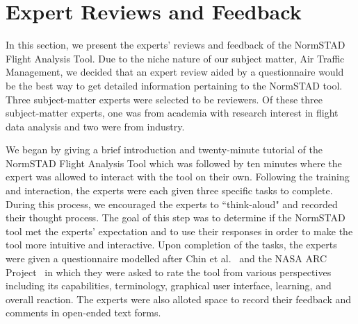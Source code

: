 \documentclass{sig-alternate}
\begin{document}
\section{Expert Reviews and Feedback}
\label{sec-expert-review}

In this section, we present the experts' reviews and feedback of the NormSTAD Flight 
Analysis Tool. Due to the niche nature of our subject matter, Air Traffic Management, we decided
that an expert review aided by a questionnaire would be the best way to get detailed
information pertaining to the NormSTAD tool. Three subject-matter experts were selected
to be reviewers. Of these three subject-matter experts, one was from academia with 
research interest in flight data analysis and two were from industry. 

We began by giving a brief introduction and twenty-minute
tutorial of the NormSTAD Flight Analysis Tool which was followed by ten minutes where
the expert was allowed to interact with the tool on their own. Following the training
and interaction, the experts were each given three specific tasks to complete. 
During this process, we encouraged the experts to ``think-aloud" and recorded their 
thought process. The goal of this step was to determine if the NormSTAD tool met
the experts' expectation and to use their responses in order to make the tool
more intuitive and interactive. Upon completion of the tasks, the experts were
given a questionnaire modelled after Chin et al.~\cite{Chin88} and the 
NASA ARC Project~\cite{NASA}
 in which they were asked to rate the tool from various perspectives
including its capabilities, terminology, graphical user interface, learning, and
overall reaction. The experts were also alloted space to record their feedback
and comments in open-ended text forms.
\end{document}

